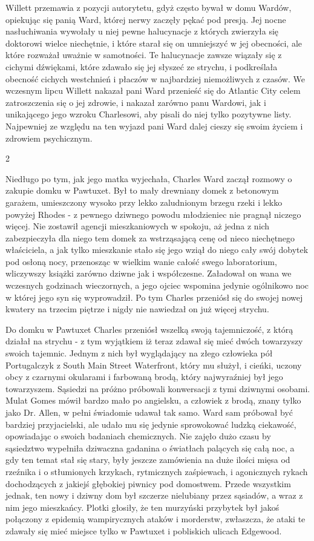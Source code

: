 Willett przemawia z pozycji autorytetu, gdyż często bywał w domu Wardów, opiekując się panią Ward, której nerwy zaczęły pękać pod presją. Jej nocne nasłuchiwania wywołały u niej pewne halucynacje z których zwierzyła się doktorowi wielce niechętnie, i które starał się on umniejszyć w jej obecności, ale które rozważał uważnie w samotności. Te halucynacje zawsze wiązały się z cichymi dźwiękami, które zdawało się jej słyszeć ze strychu, i podkreślała obecność cichych westchnień i płaczów w najbardziej niemożliwych z czasów. We wczesnym lipcu Willett nakazał pani Ward przenieść się do Atlantic City celem zatroszczenia się o jej zdrowie, i nakazał zarówno panu Wardowi, jak i unikającego jego wzroku Charlesowi, aby pisali do niej tylko pozytywne listy. Najpewniej ze względu na ten wyjazd pani Ward dalej cieszy się swoim życiem i zdrowiem psychicznym. 

\begin{center}
2
\end{center}

Niedługo po tym, jak jego matka wyjechała, Charles Ward zaczął rozmowy o zakupie domku w Pawtuxet. Był to mały drewniany domek z betonowym garażem, umieszczony wysoko przy lekko zaludnionym brzegu rzeki i lekko powyżej Rhodes - z pewnego dziwnego powodu młodzieniec nie pragnął niczego więcej. Nie zostawił agencji mieszkaniowych w spokoju, aż jedna z nich zabezpieczyła dla niego tem domek za wstrząsającą cenę od nieco niechętnego właściciela, a jak tylko mieszkanie stało się jego wziął do niego cały swój dobytek pod osłoną nocy, przenosząc w wielkim wanie całość swego laboratorium, wliczywszy książki zarówno dziwne jak i współczesne. Załadował on wana we wczesnych godzinach wieczornych, a jego ojciec wspomina jedynie ogólnikowo noc w której jego syn się wyprowadził. Po tym Charles przeniósł się do swojej nowej kwatery na trzecim piętrze i nigdy nie nawiedzał on już więcej strychu.

Do domku w Pawtuxet Charles przeniósł wszelką swoją tajemniczość, z którą działał na strychu - z tym wyjątkiem iż teraz zdawał się mieć dwóch towarzyszy swoich tajemnic. Jednym z nich był wyglądający na złego człowieka pół Portugalczyk z South Main Street Waterfront, który mu służył, i cieńki, uczony obcy z czarnymi okularami i farbowaną brodą, który najwyraźniej był jego towarzyszem. Sąsiedzi na próżno próbowali konwersacji z tymi dziwnymi osobami. Mulat Gomes mówił bardzo mało po angielsku, a człowiek z brodą, znany tylko jako Dr. Allen, w pełni świadomie udawał tak samo. Ward sam próbował być bardziej przyjacielski, ale udało mu się jedynie sprowokować ludzką ciekawość, opowiadając o swoich badaniach chemicznych. Nie zajęło dużo czasu by sąsiedztwo wypełniła dziwaczna gadanina o światłach palących się całą noc, a gdy ten temat stał się stary, były jeszcze zamówienia na duże ilości mięsa od rzeźnika i o stłumionych krzykach, rytmicznych zaśpiewach, i agonicznych rykach dochodzących z jakiejś głębokiej piwnicy pod domostwem. Przede wszystkim jednak, ten nowy i dziwny dom był szczerze nielubiany przez sąsiadów, a wraz z nim jego mieszkańcy. Plotki głosiły, że ten murzyński przybytek był jakoś połączony z epidemią wampirycznych ataków i morderstw, zwłaszcza, że ataki te zdawały się mieć miejsce tylko w Pawtuxet i pobliskich ulicach Edgewood. 

